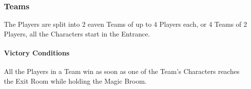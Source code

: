 \subsubsection{Teams} 
The Players are split into 2 eaven Teams of up to 4 Players each, or 4 Teams of 2 Players, all the Characters start in the Entrance.
\paragraph{Victory Conditions} All the Players in a Team win as soon as one of the Team's Characters reaches the Exit Room while holding the Magic Broom.